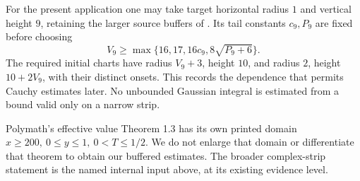 For the present application one may take target horizontal radius \(1\)
and vertical height \(9\), retaining the larger source buffers of
\cite{gnpe01}. Its tail constants \(c_9,P_9\) are fixed before choosing
\[
 V_9\ge\max\{16,17,16c_9,8\sqrt{P_9+6}\}.
\]
The required initial charts have radius \(V_9+3\), height \(10\), and
radius \(2\), height \(10+2V_9\), with their distinct onsets.
This records the dependence that permits Cauchy estimates later.
No unbounded Gaussian integral is estimated from a bound valid only on
a narrow strip.

Polymath's effective value Theorem 1.3 has its own printed domain
\(x\ge200,\ 0\le y\le1,\ 0<T\le1/2\). We do not enlarge that domain
or differentiate that theorem to obtain our buffered estimates.
The broader complex-strip statement is the named internal input above,
at its existing evidence level.
